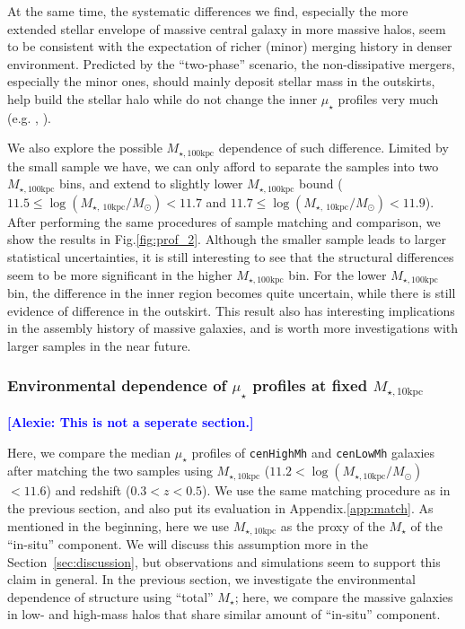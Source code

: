 \documentclass{emulateapj}
\def\rbcg{\texttt{cenHighMh}}
\def\nbcg{\texttt{cenLowMh}}
\def\mstar{{$M_{\star}$}}
\def\minn{{$M_{\star,10\mathrm{kpc}}$}}
\def\mtot{{$M_{\star,100\mathrm{kpc}}$}}
\def\logminn{{$\log (M_{\star,10\mathrm{kpc}}/M_{\odot})$}}
\def\mden{{$\mu_{\star}$}}
\newcommand{\alexie}[1]{\textcolor{blue}{\textbf{[Alexie: #1]}}}
\newcommand{\update}[1]{\textcolor{Bittersweet}{#1}}
\begin{document}
\begin{CJK*}{UTF8}{gbsn}
    At the same time, the systematic differences we find, especially the more 
    extended stellar envelope of massive central galaxy in more massive halos, 
    seem to be consistent with the expectation of richer (minor) merging history
    in denser environment. 
    \update{
    Predicted by the ``two-phase'' scenario, the non-dissipative mergers, especially 
    the minor ones, should mainly deposit stellar mass in the outskirts, help 
    build the stellar halo while do not change the inner \mden{} profiles very 
    much (e.g. \citealt{Hilz2013}, \citealt{Oogi2013}).}

    We also explore the possible \mtot{} dependence of such difference.  
    Limited by the small sample we have, we can only afford to separate the 
    samples into two \mtot{} bins, and extend to slightly lower \mtot{} bound 
    ($11.5 \leq \log (M_{\star,\ 10\mathrm{kpc}}/M_{\odot}) < 11.7$ and 
     $11.7 \leq \log (M_{\star,\ 10\mathrm{kpc}}/M_{\odot}) < 11.9$).  
    After performing the same procedures of sample matching and comparison, 
    we show the results in Fig.\ref{fig:prof_2}.   
    Although the smaller sample leads to larger statistical uncertainties, 
    it is still interesting to see that the structural differences seem to 
    be more significant in the higher \mtot{} bin.  
    For the lower \mtot{} bin, the difference in the inner region becomes quite 
    uncertain, while there is still evidence of difference in the outskirt.  
    This result also has interesting implications in the assembly history
    of massive galaxies, and is worth more investigations with larger samples
    in the near future.  


\subsubsection{Environmental dependence of \mden{} profiles at fixed \minn{}}
    \label{sssec:sbp_minn}
    
    \alexie{This is not a seperate section.}

    \update{Here, we compare the median \mden{} profiles of \rbcg{} and \nbcg{} galaxies
    after matching the two samples using \minn{} ($11.2 <$\logminn{}$ < 11.6$) and 
    redshift ($0.3 < z < 0.5$).
    We use the same matching procedure as in the previous section, and also put its 
    evaluation in Appendix.\ref{app:match}.
    As mentioned in the beginning, here we use \minn{} as the proxy of the 
    \mstar{} of the ``in-situ'' component. 
    We will discuss this assumption more in the Section~\ref{sec:discussion}, but 
    observations and simulations seem to support this claim in general. 
    In the previous section, we investigate the environmental dependence of structure 
    using ``total'' \mstar{}; here, we compare the massive galaxies in low- and 
    high-mass halos that share similar amount of ``in-situ'' component.}
    

\end{CJK*}
\end{document}
